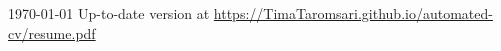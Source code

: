 \documentclass[11pt, a4paper]{awesome-cv}
\begin{document}
\makecvheader[C]

\makecvfooter
{\today}
{Up-to-date version at \upshape\color{text}\url{https://TimaTaromsari.github.io/automated-cv/resume.pdf}}
{\thepage}




\clearpage







\end{document}
